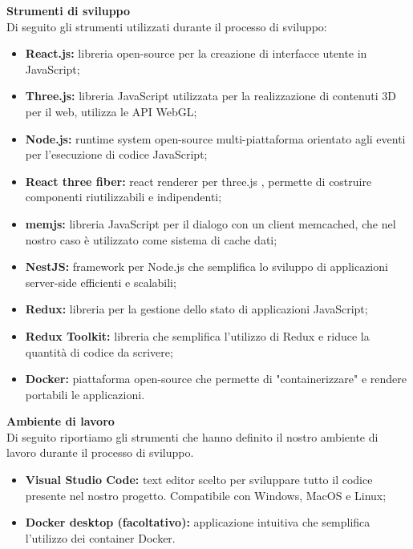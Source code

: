 \noindent \textbf{Strumenti di sviluppo}\\
Di seguito gli strumenti utilizzati durante il processo di sviluppo:
\begin{itemize}
    \item \textbf{React.js:} libreria open-source per la creazione di interfacce utente in JavaScript;
    \item \textbf{Three.js:} libreria JavaScript utilizzata per la realizzazione di contenuti 3D per il web, utilizza le
    API WebGL;
    \item \textbf{Node.js:} runtime system open-source multi-piattaforma orientato agli eventi per l’esecuzione
    di codice JavaScript;
    \item \textbf{React three fiber:} react renderer per three.js , permette di costruire componenti riutilizzabili
    e indipendenti;
    \item \textbf{memjs:} libreria JavaScript per il dialogo con un client memcached, che nel nostro caso è utilizzato come sistema di cache dati;
    \item \textbf{NestJS:} framework per Node.js che semplifica lo sviluppo di applicazioni server-side efficienti e scalabili;
    \item \textbf{Redux:} libreria per la gestione dello stato di applicazioni JavaScript;
    \item \textbf{Redux Toolkit:} libreria che semplifica l'utilizzo di Redux e riduce la quantità di codice da scrivere;
    \item \textbf{Docker:} piattaforma open-source che permette di "containerizzare" e rendere portabili le applicazioni.
\end{itemize}
\vspace{1em}

\noindent \textbf{Ambiente di lavoro}\\
Di seguito riportiamo gli strumenti che hanno definito il nostro ambiente di lavoro durante il processo di
sviluppo.

\begin{itemize}
    \item \textbf{Visual Studio Code:} text editor scelto per sviluppare tutto il codice presente nel nostro progetto.
    Compatibile con Windows, MacOS e Linux;
    \item \textbf{Docker desktop (facoltativo):} applicazione intuitiva che semplifica l'utilizzo dei container Docker.
\end{itemize}
\vspace{1em}


